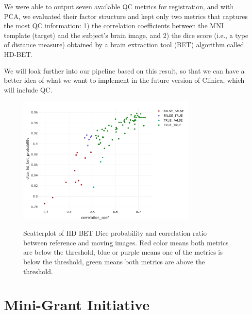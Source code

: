 \documentclass{article}
\begin{document}
We were able to output seven available QC metrics for registration, and with PCA, we evaluated their factor structure and kept only two metrics that captures the most QC information: 1) the correlation coefficients between the MNI template (target) and the subject’s brain image, and 2) the dice score (i.e., a type of distance measure) obtained by a brain extraction tool (BET) algorithm called HD-BET.

We will look further into our pipeline based on this result, so that we can have a better idea of what we want to implement in the future version of Clinica, which will include QC.

\begin{figure}[h]
    \centering
    \includegraphics[width=0.8\textwidth]{images/clinica-1.png}
    \label{fig:clinica-1}
    \caption{
        Scatterplot of HD BET Dice probability and correlation ratio between reference and moving images. Red color means both metrics are below the threshold, blue or purple means one of the metrics is below the threshold, green means both metrics are above the threshold.
    }
\end{figure}

\section{Mini-Grant Initiative}
\end{document}
